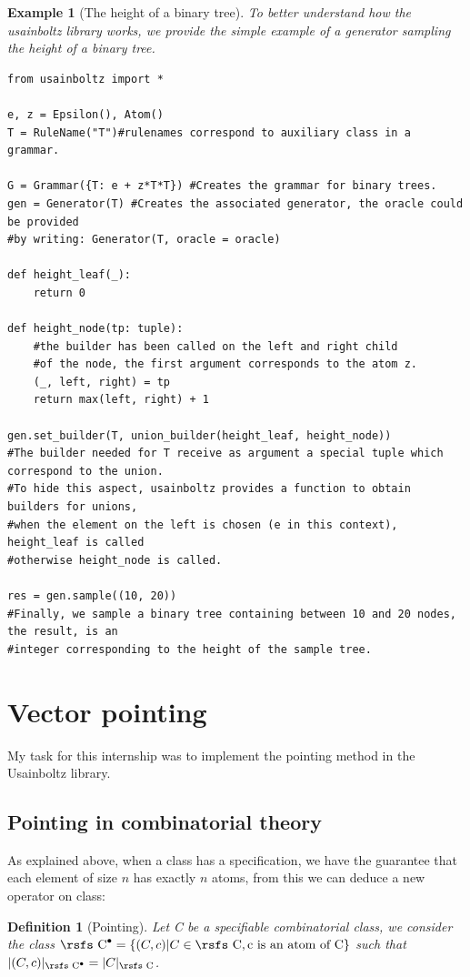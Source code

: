 \documentclass{article}
\newtheorem{example}{Example}
\newtheorem{definition}{Definition}
\begin{document}
\begin{example}[The height of a binary tree]
To better understand how the usainboltz library works, we provide the simple example of a generator sampling the height of a binary tree.
\begin{lstlisting}
from usainboltz import *

e, z = Epsilon(), Atom()
T = RuleName("T")#rulenames correspond to auxiliary class in a grammar.

G = Grammar({T: e + z*T*T}) #Creates the grammar for binary trees.
gen = Generator(T) #Creates the associated generator, the oracle could be provided
#by writing: Generator(T, oracle = oracle)

def height_leaf(_):
	return 0

def height_node(tp: tuple):
	#the builder has been called on the left and right child
	#of the node, the first argument corresponds to the atom z.
	(_, left, right) = tp
	return max(left, right) + 1

gen.set_builder(T, union_builder(height_leaf, height_node))
#The builder needed for T receive as argument a special tuple which correspond to the union.
#To hide this aspect, usainboltz provides a function to obtain builders for unions,
#when the element on the left is chosen (e in this context), height_leaf is called
#otherwise height_node is called.

res = gen.sample((10, 20))
#Finally, we sample a binary tree containing between 10 and 20 nodes, the result, is an
#integer corresponding to the height of the sample tree.
\end{lstlisting}
\end{example}



\section{Vector pointing}

My task for this internship was to implement the pointing method in the Usainboltz library.

\subsection{Pointing in combinatorial theory}
As explained above, when a class has a specification, we have the guarantee that each element of size $n$ has exactly $n$ atoms, from this we can deduce a new operator on class:

\begin{definition}[Pointing]
Let {\rsfs C} be a specifiable combinatorial class, we consider the class $\text{\rsfs C}^{\bullet} = \{(C, c) | C \in \text{\rsfs C},\text{c is an atom of C}\}$ such that $|(C,c)|_{\text{\rsfs C}^\bullet} = |C|_{\text{\rsfs C}}$.
\end{definition}
\end{document}
